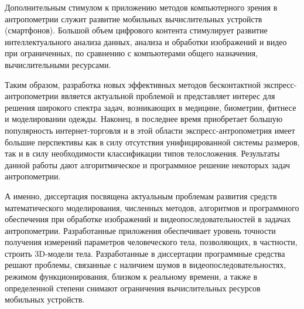 Дополнительным стимулом к приложению методов компьютерного зрения в антропометрии служит развитие мобильных вычислительных устройств (смартфонов). Большой объем цифрового контента стимулирует развитие интеллектуального анализа данных, анализа и обработки изображений и видео при ограниченных, по сравнению с компьютерами общего назначения, вычислительными ресурсами.

Таким образом, разработка новых эффективных методов бесконтактной экспресс-антропометрии является актуальной проблемой и представляет интерес для решения широкого спектра задач, возникающих в медицине, биометрии, фитнесе и моделировании одежды. Наконец, в последнее время приобретает большую популярность интернет-торговля и в этой области экспресс-антропометрия имеет большие перспективы как в силу отсутствия унифицированной системы размеров, так и в силу необходимости классификации типов телосложения. Результаты данной работы дают алгоритмическое и программное решение некоторых задач антропометрии.

А именно, диссертация посвящена актуальным проблемам развития средств математического моделирования, численных методов, алгоритмов и программного обеспечения при обработке изображений и видеопоследовательностей в задачах антропометрии. Разработанные приложения обеспечивает уровень точности получения измерений параметров человеческого тела, позволяющих, в частности, строить 3D-модели тела. Разработанные в диссертации программные средства решают проблемы, связанные с наличием шумов в видеопоследовательностях, режимом функционирования, близком к реальному времени, а также в определенной степени снимают ограничения вычислительных ресурсов мобильных устройств.

